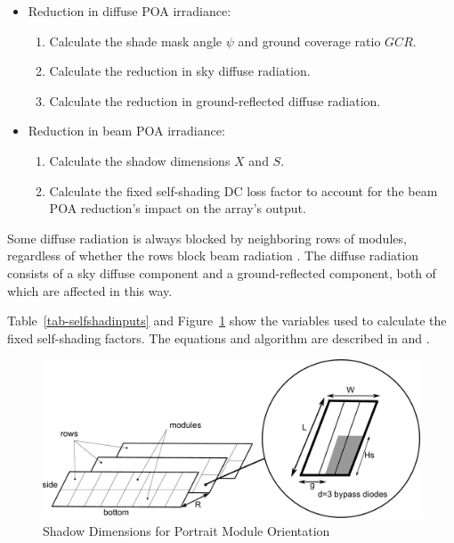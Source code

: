\documentclass[12pt,letterpaper]{article}
\newcommand\GCR{\ensuremath{\mathit{GCR}}}
\begin{document}
\begin{itemize}
\item Reduction in diffuse POA irradiance:
\begin{enumerate}
\item Calculate the shade mask angle $\psi$ and ground coverage ratio $\GCR$.
\item Calculate the reduction in sky diffuse radiation.
\item Calculate the reduction in ground-reflected diffuse radiation.
\end{enumerate}
\item Reduction in beam POA irradiance:
\begin{enumerate}
\item Calculate the shadow dimensions $X$ and $S$.
\item Calculate the fixed self-shading DC loss factor to account for the beam POA reduction's impact on the array's output.
\end{enumerate}
\end{itemize}

Some diffuse radiation is always blocked by neighboring rows of modules, regardless of whether the rows block beam radiation \citep{goswami1989}. The diffuse radiation consists of a sky diffuse component and a ground-reflected component, both of which are affected in this way.

Table~\ref{tab-selfshadinputs} and Figure~\ref{fig-selfshaddimensions} show the variables used to calculate the fixed self-shading factors. The equations and algorithm are described in \citep{appelbaum1979} and \citep{deline2013a}.

\begin{figure}
\begin{center}
\includegraphics[scale=0.33]{self-shading-shadow-dimensions}
\caption{Shadow Dimensions for Portrait Module Orientation}
\label{fig-selfshaddimensions}
\end{center}
\end{figure}
\end{document}
